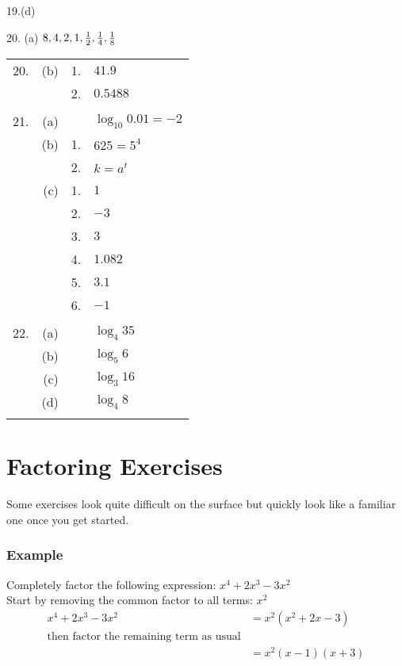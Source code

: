 19.(d)    
\setlength\fboxrule{0.01in}\setlength\fboxsep{0.2in}


20. (a) $8 ,4 ,2 ,1 ,\frac{1}{2} ,\frac{1}{4} ,\frac{1}{8}\vspace{+0.500000cm}$ \\\relax    
\setlength\fboxrule{0.01in}\setlength\fboxsep{0.2in}



\begin{tabular}[c]{rrrl}20.  & (b)
	& 1.  & $41.9$  \\
	&  & 2.
	& $0.5488$  \\
	&  &  &  \\
	21.
	& (a)  &  & $\log _{10} 0.01 = -2$  \\
	& (b)  & 1.
	& $625 =5^{4}$  \\
	&  & 2.
	& $k =a^{t}$  \\
	& (c)  & 1.
	& $1$  \\
	&  & 2.
	& $ -3$  \\
	&  & 3.
	& $3$  \\
	&  & 4.
	& $1.082$  \\
	&  & 5.
	& $3.1$  \\
	&  & 6.
	& $ -1$  \\
	&  &  &  \\
	22.
	& (a)  &  & $\log _{4} 35$  \\
	& (b)  &  & $\log _{5} 6$  \\
	& (c)  &  & $\log _{3} 16$  \\
	& (d)  &  & $\log _{4} 8$  \\
	&  &  &  \\

\end{tabular} 
\clearpage
\section{Factoring Exercises}
Some exercises look quite difficult on the surface but quickly look like a
familiar one once you get started. 

\subsubsection{Example}
Completely factor the following expression: $x^{4} +2 x^{3} -3 x^{2}$\\
Start by removing the common factor to all terms: $x^2$\\
\begin{eqnarray*} x^{4} +2 x^{3} -3 x^{2} &= x^{2} \left (x^{2} +2 x -3\right ) \\
	\text{then factor the remaining term as usual}\\
	 &= x^{2} \left (x -1\right ) \left (x +3\right )\end{eqnarray*}


